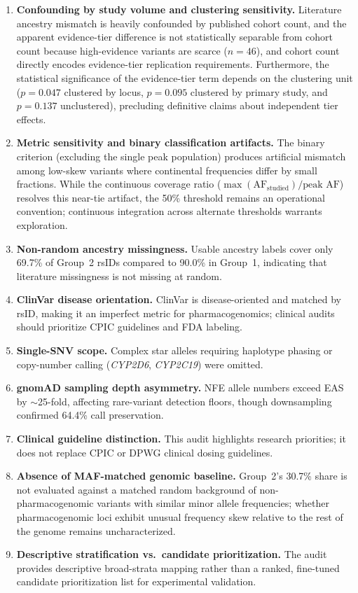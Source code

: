 \documentclass[conference]{IEEEtran}
\begin{document}
\begin{table}[!t]
\begin{enumerate}
    \item \textbf{Confounding by study volume and clustering sensitivity.}
    Literature ancestry mismatch is heavily confounded by published cohort count, and the apparent evidence-tier difference is not statistically separable from cohort count because high-evidence variants are scarce ($n = 46$), and cohort count directly encodes evidence-tier replication requirements. Furthermore, the statistical significance of the evidence-tier term depends on the clustering unit ($p = 0.047$ clustered by locus, $p = 0.095$ clustered by primary study, and $p = 0.137$ unclustered), precluding definitive claims about independent tier effects.
    \item \textbf{Metric sensitivity and binary classification artifacts.}
    The binary criterion (excluding the single peak population) produces artificial mismatch among low-skew variants where continental frequencies differ by small fractions. While the continuous coverage ratio ($\max(\text{AF}_{\text{studied}}) / \text{peak AF}$) resolves this near-tie artifact, the 50\% threshold remains an operational convention; continuous integration across alternate thresholds warrants exploration.
    \item \textbf{Non-random ancestry missingness.}
    Usable ancestry labels cover only 69.7\% of Group~2 rsIDs compared to 90.0\% in Group~1, indicating that literature missingness is not missing at random.
    \item \textbf{ClinVar disease orientation.}
    ClinVar is disease-oriented and matched by rsID, making it an imperfect metric for pharmacogenomics; clinical audits should prioritize CPIC guidelines and FDA labeling.
    \item \textbf{Single-SNV scope.} Complex star alleles requiring haplotype phasing or copy-number calling (\textit{CYP2D6}, \textit{CYP2C19}) were omitted.
    \item \textbf{gnomAD sampling depth asymmetry.} NFE allele numbers exceed EAS by $\sim$25-fold, affecting rare-variant detection floors, though downsampling confirmed 64.4\% call preservation.
    \item \textbf{Clinical guideline distinction.} This audit highlights research priorities; it does not replace CPIC or DPWG clinical dosing guidelines.
    \item \textbf{Absence of MAF-matched genomic baseline.} Group~2's 30.7\% share is not evaluated against a matched random background of non-pharmacogenomic variants with similar minor allele frequencies; whether pharmacogenomic loci exhibit unusual frequency skew relative to the rest of the genome remains uncharacterized.
    \item \textbf{Descriptive stratification vs.\ candidate prioritization.} The audit provides descriptive broad-strata mapping rather than a ranked, fine-tuned candidate prioritization list for experimental validation.
\end{enumerate}


\end{table}
\end{document}
